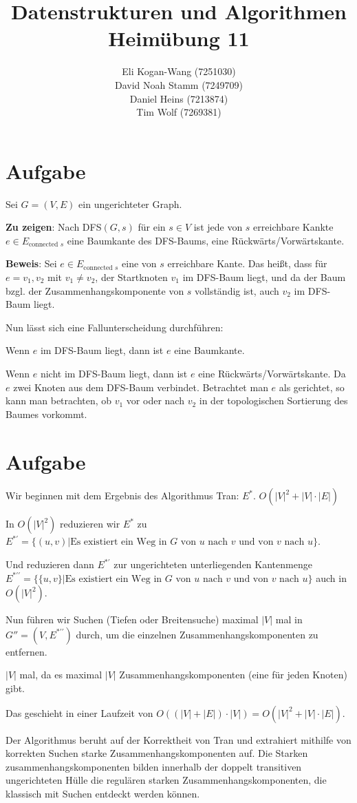 \documentclass{article}
\newcommand{\zettelNummer}{11}
\newcommand{\studierenderEins}{Eli Kogan-Wang (7251030)}
\newcommand{\studierenderZwei}{David Noah Stamm (7249709)}
\newcommand{\studierenderDrei}{Daniel Heins (7213874)}
\newcommand{\studierenderVier}{Tim Wolf (7269381)}
\newcounter{AufgabenCounter}
\newcounter{TeilaufgabenCounter}
\newenvironment{aufgabe}{\section*{Aufgabe \theAufgabenCounter}\setcounter{TeilaufgabenCounter}{1}}{\stepcounter{AufgabenCounter}}
\begin{document}
\title{Datenstrukturen und Algorithmen \\ Heimübung \zettelNummer{}}
\author{\studierenderEins{} \\
  \studierenderZwei{} \\
  \studierenderDrei{} \\
  \studierenderVier{}}

\maketitle

\begin{aufgabe}
  Sei $G=(V,E)$ ein ungerichteter Graph.

  \textbf{Zu zeigen}: Nach DFS$(G,s)$ für ein $s\in V$ ist jede von $s$ erreichbare Kankte
  $e\in E_{\text{connected }s}$ eine Baumkante des DFS-Baums, eine Rückwärts/Vorwärtskante.

  \textbf{Beweis}:
  Sei $e\in E_{\text{connected }s}$ eine von $s$ erreichbare Kante.
  Das heißt, dass für $e={v_1,v_2}$ mit $v_1\neq v_2$, der Startknoten $v_1$ im DFS-Baum liegt,
  und da der Baum bzgl. der Zusammenhangskomponente von $s$ vollständig ist, auch
  $v_2$ im DFS-Baum liegt.

  Nun lässt sich eine Fallunterscheidung durchführen:

  Wenn $e$ im DFS-Baum liegt, dann ist $e$ eine Baumkante.

  Wenn $e$ nicht im DFS-Baum liegt, dann ist $e$ eine Rückwärts/Vorwärtskante.
  Da $e$ zwei Knoten aus dem DFS-Baum verbindet. Betrachtet man
  $e$ als gerichtet, so kann man betrachten, ob $v_1$ vor oder nach $v_2$ in der topologischen Sortierung
  des Baumes vorkommt.
\end{aufgabe}
\begin{aufgabe}

  Wir beginnen mit dem Ergebnis des Algorithmus Tran: $E^*$. $O(|V|^2 + |V|\cdot |E|)$

  In $O(|V|^2)$ reduzieren wir
  $E^*$ zu
  $E^{*\prime}=\{(u,v)|\text{Es existiert ein Weg in $G$ von $u$ nach $v$ und von $v$ nach $u$}\}$.

  Und reduzieren dann $E^{*\prime}$ zur ungerichteten unterliegenden Kantenmenge $E^{*\prime\prime}=\{\{u,v\}|\text{Es existiert ein Weg in $G$ von $u$ nach $v$ und von $v$ nach $u$}\}$ auch in $O(|V|^2)$.

  Nun führen wir Suchen (Tiefen oder Breitensuche) maximal $|V|$ mal in $G''=(V,E^{*\prime\prime})$ durch, um die einzelnen Zusammenhangskomponenten zu entfernen.

  $|V|$ mal, da es maximal $|V|$ Zusammenhangskomponenten (eine für jeden Knoten) gibt.

  Das geschieht in einer Laufzeit von $O((|V| + |E|)\cdot |V|)=O(|V|^2+|V|\cdot|E|)$.

  Der Algorithmus beruht auf der Korrektheit von Tran und extrahiert mithilfe von korrekten
  Suchen starke Zusammenhangskomponenten auf.
  Die Starken zusammenhangskomponenten bilden innerhalb der doppelt transitiven ungerichteten Hülle die regulären starken
  Zusammenhangskomponenten, die klassisch mit Suchen entdeckt werden können.
\end{aufgabe}
\end{document}
